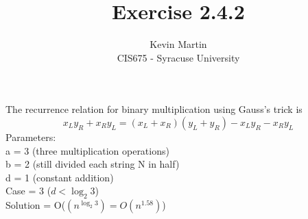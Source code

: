 \documentclass{article}
\author{Kevin Martin\\ CIS675 - Syracuse University}
\title{Exercise 2.4.2}
\begin{document}
\maketitle

The recurrence relation for binary multiplication using Gauss's trick is \[x_{L}y_{R}+x_{R}y_{L}=(x_{L}+x_{R})(y_{L}+y_{R})-x_{L}y_{R}-x_{R}y_{L}\]
Parameters:\\
a = 3 (three multiplication operations)\\
b = 2 (still divided each string N in half)\\
d = 1 (constant addition)\\
Case = 3 (\(d < \log_2 3\))\\
Solution = O(\((n^{\log_2 3}) = O(n^{1.58})\))\\
\end{document}
